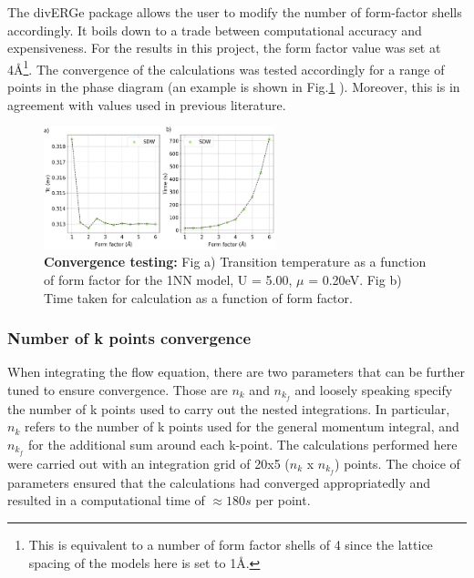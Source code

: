 \documentclass[12pt]{article}
\begin{document}
\medskip


\noindent The divERGe package allows the user to modify the number of form-factor shells accordingly. It boils down to a trade 
between computational accuracy and expensiveness. 
For the results in this project, the form factor value was set at 4\AA\footnote{This is equivalent to a number of form factor shells of 4 since the lattice spacing of the models here is set to 1\AA.}. The convergence of 
the calculations was tested accordingly for a range of points in the phase diagram (an example is shown in Fig.\ref{fig:Formfactorconvergence} ). Moreover, this is in agreement with values used in previous literature\cite{lichtenstein2018functional}. 

\begin{figure}[htbp]  %
    \centering
    \includegraphics[width=0.6\textwidth]{convergence.png}  %
    \caption{\textbf{Convergence testing:} Fig a) Transition temperature as a function of form factor for the 1NN model, U = 5.00, $\mu$ = 0.20eV. Fig b) Time taken for calculation
    as a function of form factor.   }
    \label{fig:Formfactorconvergence}
\end{figure}

\newpage





\subsubsection{Number of k points convergence }

When integrating the flow equation, there are two parameters that can be further tuned to ensure convergence.
Those are $n_k$ and $n_{k_f}$ and  loosely speaking specify the number of k points used to carry out the nested integrations. 
In particular, $n_k$ refers to the number of k points used for the general momentum integral, and $n_{k_f}$ for 
the additional sum around each k-point. The calculations performed here were carried out with an integration 
grid of 20x5 ($n_k$ x $n_{k_f}$) points. The choice of parameters ensured that the calculations had converged appropriatedly 
and resulted in a computational time of $\approx 180s$ per point. 
\end{document}
